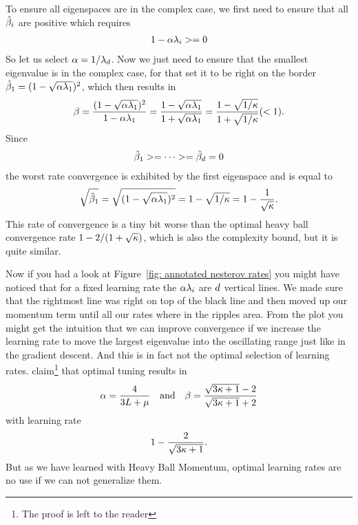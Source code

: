 To ensure all eigenspaces are in the complex case, we first need to ensure that
all \(\tilde{\beta}_i\) are positive which requires
\begin{align*}
	1-\alpha\lambda_i >= 0
\end{align*}
So let us select \(\alpha= 1/\lambda_d\). Now we just need to ensure
that the smallest eigenvalue is in the complex case, for that set it to be
right on the border \(\tilde{\beta}_1=(1-\sqrt{\alpha\lambda_1})^2\),
which then results in
\begin{align*}
	\beta = \frac{(1-\sqrt{\alpha\lambda_1})^2}{1-\alpha\lambda_1}
	=\frac{1-\sqrt{\alpha\lambda_1}}{1+\sqrt{\alpha\lambda_1}}
	=\frac{1-\sqrt{1/\kappa}}{1+\sqrt{1/\kappa}} (< 1).
\end{align*}
Since
\begin{align*}
	\tilde{\beta}_1 >= \dots >=\tilde{\beta}_d=0
\end{align*}
the worst rate convergence is exhibited by the first eigenspace and is equal to
\begin{align}\label{eq: nesterov convegence rate eigenvalue derivation}
	\sqrt{\tilde{\beta}_1} = \sqrt{(1-\sqrt{\alpha\lambda_1})^2}
	= 1-\sqrt{1/\kappa} = 1- \frac{1}{\sqrt{\kappa}}.
\end{align}
%
This rate of convergence is a tiny bit worse than the optimal heavy ball
convergence rate \(1-2/(1+\sqrt{\kappa})\), which is also the complexity
bound, but it is quite similar.

Now if you had a look at Figure~\ref{fig:
annotated nesterov rates} you might have noticed that for a fixed learning
rate the \(\alpha\lambda_i\) are \(d\) vertical lines. We made sure
that the rightmost line was right on top of the black line and then moved up
our momentum term until all our rates where in the ripples area. From the
plot you might get the intuition that we can improve convergence if we
increase the learning rate to move the largest eigenvalue into the oscillating
range just like in the gradient descent. And this is in fact not the optimal
selection of learning rates. \textcite{lessardAnalysisDesignOptimization2016}
claim\footnote{The proof is left to the reader} that optimal tuning results in
\begin{align*}
	\alpha = \frac{4}{3L + \mu}
	\quad \text{and} \quad
	\beta = \frac{\sqrt{3\kappa+1}-2}{\sqrt{3\kappa+1}+2}
\end{align*}
with learning rate
\begin{align*}
	1-\frac{2}{\sqrt{3\kappa+1}}.
\end{align*}
But as we have learned with
Heavy Ball Momentum, optimal learning rates are no use if we can not generalize
them.

